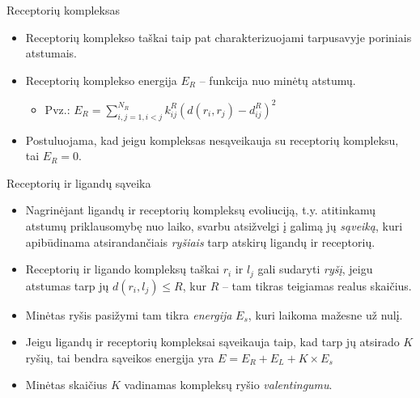 \documentclass[11pt]{beamer}
\begin{document}

\begin{frame}{Receptorių kompleksas}
\begin{itemize}
\item Receptorių komplekso taškai taip pat charakterizuojami tarpusavyje poriniais atstumais.
\item Receptorių komplekso energija $E_R$  -- funkcija nuo minėtų atstumų.
    \begin{itemize}
       \item Pvz.: $E_R = \sum\limits_{i,j=1,i<j}^{N_R} k_{ij}^R (d(r_i,r_j) - d_{ij}^R)^{2} $
    \end{itemize}
\item Postuluojama, kad jeigu kompleksas nesąveikauja su receptorių kompleksu, tai $E_R = 0$.
\end{itemize}
\end{frame}



\begin{frame}{Receptorių ir ligandų sąveika }
\begin{itemize}
\item Nagrinėjant ligandų ir receptorių kompleksų evoliuciją, t.y. atitinkamų atstumų priklausomybę nuo laiko, 
svarbu atsižvelgi į galimą jų \textit{sąveiką}, kuri apibūdinama atsirandančiais \textit{ryšiais} tarp atskirų ligandų ir receptorių.
\item Receptorių ir ligando kompleksų taškai $r_i$ ir $l_j$ gali sudaryti \textit{ryšį}, jeigu  atstumas tarp jų 
$d(r_i,l_j) \leqslant R$, kur $R$ -- tam tikras teigiamas realus skaičius. 
\item Minėtas ryšis pasižymi tam tikra \textit{energija} $E_s$, kuri laikoma mažesne už nulį.
\item Jeigu ligandų ir receptorių kompleksai  sąveikauja taip, kad tarp jų atsirado $K$ ryšių, tai bendra sąveikos energija
yra $E = E_R + E_L + K \times E_s$
\item Minėtas skaičius $K$ vadinamas kompleksų ryšio \textit{valentingumu}.
\end{itemize}
\end{frame}
\end{document}
